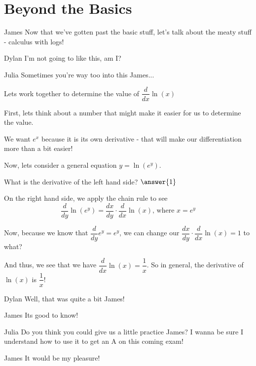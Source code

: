 \documentclass{ximera}
\begin{document}
\section{Beyond the Basics}
\begin{dialogue}
\item[James] Now that we've gotten past the basic stuff, let's talk about the meaty stuff - calculus with logs!
\item[Dylan] I'm not going to like this, am I?
\item[Julia] Sometimes you're way too into this James...
\end{dialogue}
\begin{example}
Lets work together to determine the value of $\dfrac{d}{dx}\ln(x)$
\begin{explanation}
First, lets think about a number that might make it easier for us to determine the value.
\begin{multipleChoice}
\choice{$\pi$}
\end{multipleChoice}
\begin{feedback}
We want $e^x$ because it is its own derivative - that will make our differentiation more than a bit easier!
\end{feedback}

Now, lets consider a general equation $y = \ln(e^y)$.

What is the derivative of the left hand side?
$\answer{1}$

On the right hand side, we apply the chain rule to see $$\dfrac{d}{dy} \ln(e^y) = \dfrac{dx}{dy} \cdot \dfrac{d}{dx}\ln(x) \text{, where } x = e^y$$

Now, because we know that $\dfrac{d}{dy}e^y = e^y$, we can change our $\dfrac{dx}{dy}\cdot\dfrac{d}{dx}\ln(x) = 1$ to what?

\begin{multipleChoice}
\end{multipleChoice}
\begin{feedback}
And thus, we see that we have $\dfrac{d}{dx}\ln(x) = \dfrac{1}{x}$. So in general, the derivative of $\ln(x)$ is $\dfrac{1}{x}$!
\end{feedback}
\end{explanation}
\end{example}

\begin{dialogue}
\item[Dylan] Well, that was quite a bit James!
\item[James] Its good to know!
\item[Julia] Do you think you could give us a little practice James? I wanna be sure I understand how to use it to get an A on this coming exam!
\item[James] It would be my pleasure!
\end{dialogue}
\end{document}
